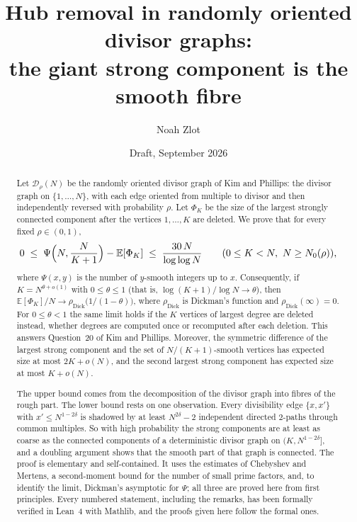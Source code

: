 \documentclass[11pt]{amsart}
\title[Hub removal in randomly oriented divisor graphs]{Hub removal in randomly oriented divisor graphs:\\ the giant strong component is the smooth fibre}
\author{Noah Zlot}
\date{Draft, September 2026}
\theoremstyle{definition}
\newcommand{\dick}{\rho_{\mathrm{Dick}}}
\newcommand{\E}{\mathbb{E}}
\newcommand{\cD}{\mathcal{D}}
\begin{document}
\begin{abstract}
Let $\cD_\rho(N)$ be the randomly oriented divisor graph of Kim and Phillips: the divisor graph on $\{1,\dots,N\}$, with each edge oriented from multiple to divisor and then independently reversed with probability $\rho$. Let $\Phi_K$ be the size of the largest strongly connected component after the vertices $1,\dots,K$ are deleted. We prove that for every fixed $\rho\in(0,1)$,
\[
0\;\le\;\Psi\Bigl(N,\frac{N}{K+1}\Bigr)-\E[\Phi_K]\;\le\;\frac{30\,N}{\log\log N}\qquad(0\le K<N,\ N\ge N_0(\rho)),
\]
where $\Psi(x,y)$ is the number of $y$-smooth integers up to $x$. Consequently, if $K=N^{\theta+o(1)}$ with $0\le\theta\le 1$ (that is, $\log(K+1)/\log N\to\theta$), then $\E[\Phi_K]/N\to\dick\bigl(1/(1-\theta)\bigr)$, where $\dick$ is Dickman's function and $\dick(\infty)=0$. For $0\le\theta<1$ the same limit holds if the $K$ vertices of largest degree are deleted instead, whether degrees are computed once or recomputed after each deletion. This answers Question~20 of Kim and Phillips. Moreover, the symmetric difference of the largest strong component and the set of $N/(K+1)$-smooth vertices has expected size at most $2K+o(N)$, and the second largest strong component has expected size at most $K+o(N)$.

The upper bound comes from the decomposition of the divisor graph into fibres of the rough part. The lower bound rests on one observation. Every divisibility edge $\{x,x'\}$ with $x'\le N^{1-2\delta}$ is shadowed by at least $N^{2\delta}-2$ independent directed $2$-paths through common multiples. So with high probability the strong components are at least as coarse as the connected components of a deterministic divisor graph on $(K,N^{1-2\delta}]$, and a doubling argument shows that the smooth part of that graph is connected. The proof is elementary and self-contained. It uses the estimates of Chebyshev and Mertens, a second-moment bound for the number of small prime factors, and, to identify the limit, Dickman's asymptotic for $\Psi$; all three are proved here from first principles. Every numbered statement, including the remarks, has been formally verified in Lean~4 with Mathlib, and the proofs given here follow the formal ones.
\end{abstract}

\maketitle

\setcounter{tocdepth}{1}
\tableofcontents
\end{document}
